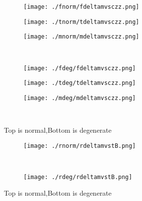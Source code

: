 \documentclass[aps,floats,floatfix,nofootinbib]{revtex4-1}
\begin{document}
\begin{center}
\begin{figure}
\begin{subfigure}{0.3\textwidth}
\texttt{[image: ./fnorm/fdeltamvsczz.png]}
\label{}
\end{subfigure}
\begin{subfigure}{0.3\textwidth}
\texttt{[image: ./tnorm/tdeltamvsczz.png]}
\label{}
\end{subfigure}
\begin{subfigure}{0.3\textwidth}
\texttt{[image: ./mnorm/mdeltamvsczz.png]}
\label{}
\end{subfigure}\\
\begin{subfigure}{0.3\textwidth}
\texttt{[image: ./fdeg/fdeltamvsczz.png]}
\label{}
\end{subfigure}
\begin{subfigure}{0.3\textwidth}
\texttt{[image: ./tdeg/tdeltamvsczz.png]}
\label{}
\end{subfigure}
\begin{subfigure}{0.3\textwidth}
\texttt{[image: ./mdeg/mdeltamvsczz.png]}
\label{}
\end{subfigure}\\
\caption{Top is normal,Bottom is degenerate}
\end{figure}
\end{center}

\begin{center}
\begin{figure}
\begin{subfigure}{0.95\textwidth}
\texttt{[image: ./rnorm/rdeltamvstB.png]}
\label{}
\end{subfigure}\\
\begin{subfigure}{0.95\textwidth}
\texttt{[image: ./rdeg/rdeltamvstB.png]}
\label{}
\end{subfigure}
\caption{Top is normal,Bottom is degenerate}
\end{figure}
\end{center}
\end{document}
